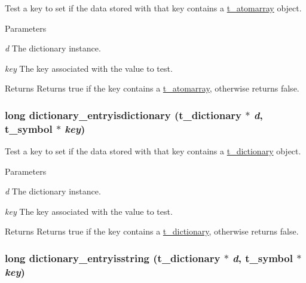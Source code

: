 Test a key to set if the data stored with that key contains a \hyperlink{structt__atomarray}{t\_\-atomarray} object. 
\begin{DoxyParams}{Parameters}
\item[{\em d}]The dictionary instance. \item[{\em key}]The key associated with the value to test. \end{DoxyParams}
\begin{DoxyReturn}{Returns}
Returns true if the key contains a \hyperlink{structt__atomarray}{t\_\-atomarray}, otherwise returns false. 
\end{DoxyReturn}
\hypertarget{group__dictionary_gad8055f980993051fb94f8214db876ea2}{
\subsubsection[{dictionary\_\-entryisdictionary}]{\setlength{\rightskip}{0pt plus 5cm}long dictionary\_\-entryisdictionary ({\bf t\_\-dictionary} $\ast$ {\em d}, \/  {\bf t\_\-symbol} $\ast$ {\em key})}}
\label{group__dictionary_gad8055f980993051fb94f8214db876ea2}


Test a key to set if the data stored with that key contains a \hyperlink{structt__dictionary}{t\_\-dictionary} object. 
\begin{DoxyParams}{Parameters}
\item[{\em d}]The dictionary instance. \item[{\em key}]The key associated with the value to test. \end{DoxyParams}
\begin{DoxyReturn}{Returns}
Returns true if the key contains a \hyperlink{structt__dictionary}{t\_\-dictionary}, otherwise returns false. 
\end{DoxyReturn}
\hypertarget{group__dictionary_gac60faf9cb165c96aced356959f1faeb3}{
\subsubsection[{dictionary\_\-entryisstring}]{\setlength{\rightskip}{0pt plus 5cm}long dictionary\_\-entryisstring ({\bf t\_\-dictionary} $\ast$ {\em d}, \/  {\bf t\_\-symbol} $\ast$ {\em key})}}
\label{group__dictionary_gac60faf9cb165c96aced356959f1faeb3}


